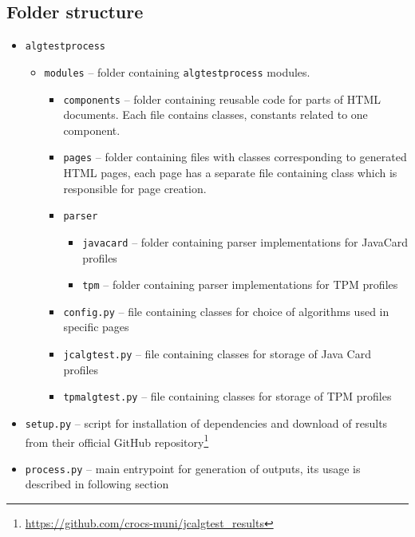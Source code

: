 \subsection{Folder structure}
\begin{itemize}
    \item \texttt{algtestprocess}
        \begin{itemize}
            \item \texttt{modules} -- folder containing \texttt{algtestprocess} modules.
                \begin{itemize}
                    \item \texttt{components} -- folder containing reusable code for parts of HTML documents. Each file contains classes, constants related to one component.
                    \item \texttt{pages} -- folder containing files with classes corresponding to generated HTML pages, each page has a separate file containing class which is responsible for page creation.
                    \item \texttt{parser}
                        \begin{itemize}
                            \item \texttt{javacard} -- folder containing parser implementations for JavaCard profiles
                            \item \texttt{tpm} -- folder containing parser implementations for TPM profiles
                        \end{itemize}
                    \item \texttt{config.py} -- file containing classes for choice of algorithms used in specific pages
                    \item \texttt{jcalgtest.py} -- file containing classes for storage of Java Card profiles
                    \item \texttt{tpmalgtest.py} -- file containing classes for storage of TPM profiles
                \end{itemize}
        \end{itemize}
    \item \texttt{setup.py} -- script for installation of dependencies and download of results from their official GitHub repository\footnote{\url{https://github.com/crocs-muni/jcalgtest_results}}
    \item \texttt{process.py} -- main entrypoint for generation of outputs, its usage is described in following section
\end{itemize}

